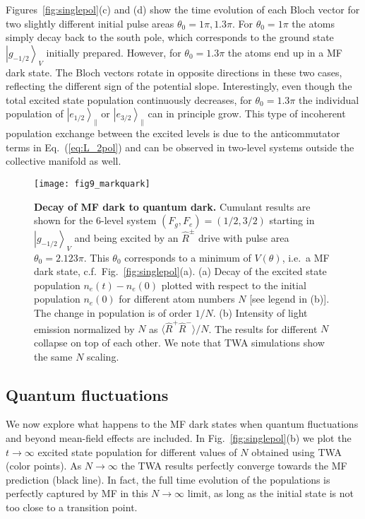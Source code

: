 \documentclass[aps,prx,superscriptaddress,twocolumn,notitlepage,nofootinbib,longbibliography]{revtex4-2}
\newcommand{\ket}[1]{\left|#1\right>}
\begin{document}
Figures~\ref{fig:singlepol}(c) and (d) show the time evolution of each Bloch vector for two slightly different initial pulse areas $\theta_0=1\pi,1.3\pi$. For $\theta_0=1\pi$ the atoms simply decay back to the south pole, which corresponds to the ground state $\ket{g_{-1/2}}_V$ initially prepared. However, for $\theta_0=1.3\pi$ the atoms end up in a MF dark state. The Bloch vectors rotate in opposite directions in these two cases, reflecting the different sign of the potential slope.
Interestingly, even though the total excited state population continuously decreases, for $\theta_0=1.3\pi$ the individual population of $\ket{e_{1/2}}_\parallel$ or $\ket{e_{3/2}}_\parallel$ can in principle grow. This type of incoherent population exchange between the excited levels is due to the anticommutator terms in Eq.~(\ref{eq:L_2pol}) and can be observed in two-level systems outside the collective manifold as well.


\begin{figure}[t]
\centering
\texttt{[image: fig9\_markquark]}
\caption{\textbf{Decay of MF dark to quantum dark.} Cumulant results are shown for the 6-level system $(F_g,F_e)=(1/2,3/2)$ starting in $\ket{g_{-1/2}}_V$ and being excited by an $\hat{R}^\pm$ drive with pulse area $\theta_0=2.123\pi$. This $\theta_0$ corresponds to a minimum of $V(\theta)$, i.e.~a MF dark state, c.f.~Fig.~\ref{fig:singlepol}(a). (a) Decay of the excited state population $n_e(t)-n_e(0)$ plotted with respect to the initial population $n_e(0)$ for different atom numbers $N$ [see legend in (b)]. The change in population is of order $1/N$. (b) Intensity of light emission normalized by $N$ as $\langle \hat{R}^+\hat{R}^- \rangle/N$. The results for different $N$ collapse on top of each other. We note that TWA simulations show the same $N$ scaling.}
\label{fig:markquark}
\end{figure}





\subsection{Quantum fluctuations\label{ssec:singlepol_qfluc}}

We now explore what happens to the MF dark states when quantum fluctuations and beyond mean-field effects are included. In Fig.~\ref{fig:singlepol}(b) we plot the $t\rightarrow \infty$ excited state population for different values of $N$ obtained using TWA (color points). As $N\rightarrow\infty$ the TWA results perfectly converge towards the MF prediction (black line).
In fact, the full time evolution of the populations is perfectly captured by MF in this $N\rightarrow\infty$ limit, as long as the initial state is not too close to a transition point.
\end{document}
